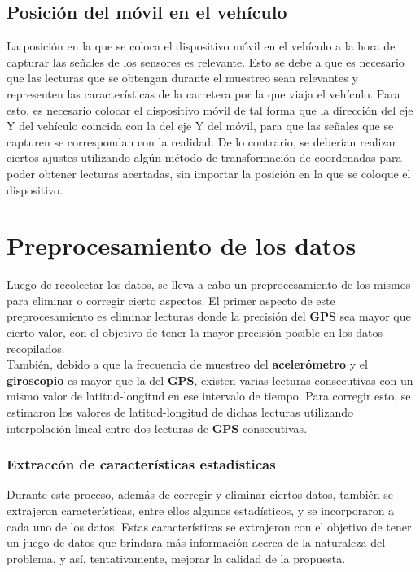 	\subsection{Posición del móvil en el vehículo}
		La posición en la que se coloca el dispositivo móvil en el vehículo a la hora de capturar las señales de los sensores es
		relevante. Esto se debe a que es necesario que las lecturas que se obtengan durante el muestreo sean relevantes y representen
		las características de la carretera por la que viaja el vehículo. Para esto, es necesario colocar el dispositivo móvil de tal 
		forma que la dirección del eje Y del vehículo coincida con la del eje Y del móvil, para que las señales que se capturen
		se correspondan con la realidad. De lo contrario, se deberían realizar ciertos ajustes utilizando algún método de
		transformación de coordenadas para poder obtener lecturas acertadas, sin importar la posición en la que se coloque
		el dispositivo.

\section{Preprocesamiento de los datos}
	Luego de recolectar los datos, se lleva a cabo un preprocesamiento de los mismos para eliminar o corregir cierto aspectos.
	El primer aspecto de este preprocesamiento es eliminar lecturas donde la precisión del \textbf{GPS} sea mayor que cierto valor,
	con el objetivo de tener la mayor precisión posible en los datos recopilados.\\
	\indent También, debido a que la frecuencia de muestreo del \textbf{acelerómetro} y el \textbf{giroscopio} es mayor que la del
	\textbf{GPS}, existen varias lecturas consecutivas con un mismo valor de latitud-longitud en ese intervalo de tiempo. Para
	corregir esto, se estimaron los valores de latitud-longitud de dichas lecturas utilizando interpolación lineal entre dos lecturas
	de \textbf{GPS} consecutivas.

	\subsubsection{Extraccón de características estadísticas}
		Durante este proceso, además de corregir y eliminar ciertos datos, también se extrajeron características, entre ellos
		algunos estadísticos, y se incorporaron a cada uno de los datos. Estas características se extrajeron con el objetivo
		de tener un juego de datos que brindara más información acerca de la naturaleza del problema, y así, tentativamente,
		mejorar la calidad de la propuesta.\\

